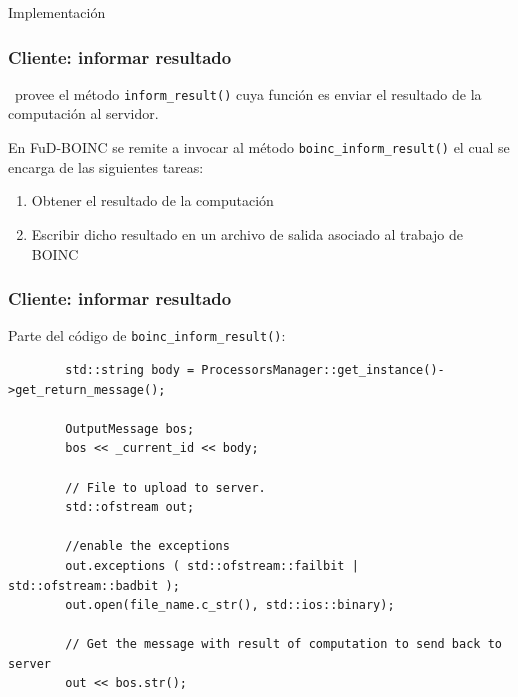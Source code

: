 \begin{subsection}{Implementación}
	\begin{frame}\frametitle{Cliente: informar resultado}
		\begin{block}{}
			\fud \ provee el método \texttt{inform\_result()} cuya función es enviar el resultado de la computación al servidor.
		\end{block}
		\pause
		\vspace{6mm}
		En FuD-BOINC se remite a invocar al método \texttt{boinc\_inform\_result()} el cual se encarga de las siguientes tareas:
		\vspace{4mm}
		\begin{enumerate}\addtolength{\itemsep}{3mm}
			\item Obtener el resultado de la computación
			\item Escribir dicho resultado en un archivo de salida asociado al trabajo de BOINC
		\end{enumerate}
	\end{frame}

	\begin{frame}[fragile]\frametitle{Cliente: informar resultado}
		Parte del código de \texttt{boinc\_inform\_result()}:
		\vspace{4mm}
			\begin{lstlisting}
		std::string body = ProcessorsManager::get_instance()->get_return_message();
	
		OutputMessage bos;
		bos << _current_id << body;
	
		// File to upload to server.
		std::ofstream out;
	
		//enable the exceptions
		out.exceptions ( std::ofstream::failbit | std::ofstream::badbit );
		out.open(file_name.c_str(), std::ios::binary);
	
		// Get the message with result of computation to send back to server
		out << bos.str();
			\end{lstlisting}
	\end{frame}


\end{subsection}
